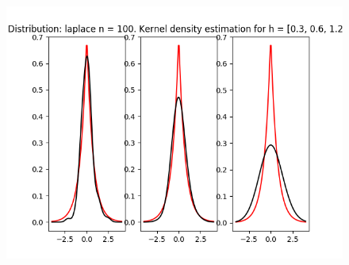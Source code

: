 \documentclass[12pt]{report}
\begin{document}
\begin{center}
\begin{figure}[H]
\includegraphics[width=\textwidth]{../lab_4/pic/kernel/d_laplace100.png}
\end{figure}


\end{center}
\end{document}
